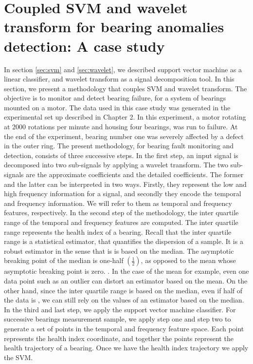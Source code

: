 \documentclass[../Main/thesis.tex]{subfiles}
\begin{document}
\section{Coupled SVM and wavelet transform for bearing anomalies detection: A case study}
\label{sec:result-svm-wavelet}
In section \ref{sec:svm} and \ref{sec:wavelet}, we described support vector machine as a linear classifier, and wavelet transform as a signal decomposition tool. In this section, we present a methodology that couples SVM and wavelet transform. The objective is to monitor and detect bearing failure, for a system of bearings mounted on a motor. The data used in this case study was generated in the experimental set up described in Chapter 2. In this experiment, a motor rotating at 2000 rotations per minute and housing four bearings, was run to failure. At the end of the experiment, bearing number one was severely affected by a defect in the outer ring.
\justify
The present methodology, for bearing fault monitoring and detection, consists of three successive steps. In the first step, an input signal is decomposed into two sub-signals by applying a wavelet transform. The two sub-signals are the approximate coefficients and the detailed coefficients. The former and the latter can be interpreted in two ways. Firstly, they represent the low and high frequency information for a signal, and secondly they encode the temporal and frequency information. We will refer to them as temporal and frequency features, respectively. 
\justify
In the second step of the methodology, the inter quartile range of the temporal and frequency features are computed. The inter quartile range represents the health index of a bearing. Recall that the inter quartile range is a statistical estimator, that quantifies the dispersion of a sample. It is a robust estimator in the sense that is is based on the median. The asymptotic breaking point of the median is one-half $\left(\frac{1}{2}\right)$, as opposed to the mean whose asymptotic breaking point is zero. . In the case of the mean for example, even one  data point such as an outlier can distort an estimator based on the mean. On the other hand, since the inter quartile range is based on the median, even if half of the data is , we can still rely on the values of an estimator based on the median. 
\justify
In the third and last step, we apply the support vector machine classifier. For successive bearings measurement sample, we apply step one and step two to generate a set of points in the temporal and frequency feature space. Each point represents the health index coordinate, and together the points represent the health trajectory of a bearing. Once we have the health index trajectory we apply the SVM.
\end{document}
